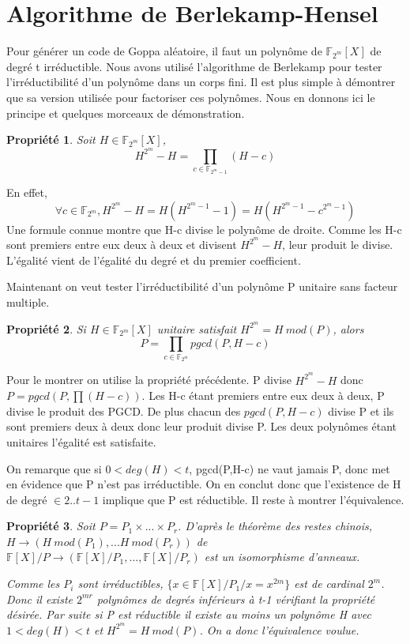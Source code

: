 \documentclass{article}
\newtheorem{prop}{Propriété}
\begin{document}
	\section{Algorithme de Berlekamp-Hensel}
		\label{BH}
		\cite{berlekamp}
		Pour générer un code de Goppa aléatoire, il faut un polynôme de $ \mathbb{F}_{2^{m}}[X] $ de degré t irréductible.
		Nous avons utilisé l'algorithme de Berlekamp pour tester l'irréductibilité d'un polynôme dans un corps fini.
		Il est plus simple à démontrer que sa version utilisée pour factoriser ces polynômes.
		Nous en donnons ici le principe et quelques morceaux de démonstration.

		\begin{prop}
			Soit $H \in \mathbb{F}_{2^{m}}[X]$, 
			$$H^{2^{m}} - H = \prod_{c \in \mathbb{F}_{2^{m}-1}}(H-c)$$
		\end{prop}
		En effet,
		$$ \forall c \in \mathbb{F}_{2^{m}}, H^{2^{m}}-H = H(H^{2^{m}-1}-1) = H(H^{2^{m}-1}-c^{2^{m}-1})$$
		Une formule connue montre que H-c divise le polynôme de droite.
		Comme les H-c sont premiers entre eux deux à deux et divisent $ H^{2^{m}} -H $, leur produit le divise.
		L'égalité vient de l'égalité du degré et du premier coefficient.

		Maintenant on veut tester l'irréductibilité d'un polynôme P unitaire sans facteur multiple.
		\begin{prop}
			Si $H \in \mathbb{F}_{2^{m}}[X]$ unitaire satisfait $H^{2^{m}} = H \ mod(P)$, alors 
			$$P = \prod_{c\in \mathbb{F}_{2^{m}}}pgcd(P,H-c)$$
		\end{prop}

		Pour le montrer on utilise la propriété précédente.
		P divise $H^{2^{m}} - H$ donc $P = pgcd(P,\prod(H-c))$.
		Les H-c étant premiers entre eux deux à deux, P divise le produit des PGCD.
		De plus chacun des $pgcd(P,H-c)$ divise P et ils sont premiers deux à deux donc leur produit divise P.
		Les deux polynômes étant unitaires l'égalité est satisfaite.

		On remarque que si $0<deg(H) <t$, pgcd(P,H-c) ne vaut jamais P, donc met en évidence que P n'est pas irréductible.
		On en conclut donc que l'existence de H  de degré $\in 2..t-1$ implique que P est réductible.
		Il reste à montrer l'équivalence.

		\begin{prop}
			Soit $P = P_{1} \times ... \times P_{r}$.
			D'après le théorème des restes chinois, $H \rightarrow (H \ mod(P_{1}),...H \ mod(P_{r}))$ de $\mathbb{F}[X]/P \rightarrow (\mathbb{F}[X]/P_{1},...,\mathbb{F}[X]/P_{r})$ est un isomorphisme d'anneaux.

			Comme les $P_{i}$ sont irréductibles, $\{x \in \mathbb{F}[X]/P_{1}/ x = x^{2{m}} \}$ est de cardinal $2^{m}$.
			Donc il existe $2^{mr}$ polynômes de degrés inférieurs à t-1 vérifiant la propriété désirée.
			Par suite si P est réductible il existe au moins un polynôme H avec $1 < deg(H) < t$ et $H^{2^{m}} = H \ mod(P)$.
			On a donc l'équivalence voulue.
		\end{prop}
\end{document}

